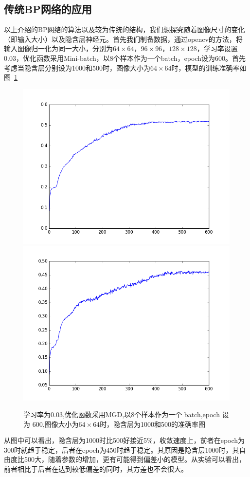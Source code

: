 \subsection{传统BP网络的应用}
以上介绍的BP网络的算法以及较为传统的结构，我们想探究随着图像尺寸的变化（即输入大小）以及隐含层神经元。首先我们制备数据，通过opencv的方法，将输入图像归一化为同一大小，分别为$64\times 64$，$96\times 96$，$128\times 128$，学习率设置0.03，优化函数采用Mini-batch，以8个样本作为一个batch，epoch设为600。首先考虑当隐含层分别设为1000和500时，图像大小为$64\times 64$时，模型的训练准确率如图~\ref{fig:bp6}
\begin{figure}[htb]
\centering
\includegraphics[scale=0.35]{../figures/Log/BP_new1/BP_new1_acc.png}
\includegraphics[scale=0.35]{../figures/Log/BP_new4/BP_new4_acc.png} 
\caption{学习率为0.03,优化函数采用MGD,以8个样本作为一个 batch,epoch 设为 600,图像大小为$64\times 64$时，隐含层为1000和500的准确率图}
\label{fig:bp6}
\end{figure}
从图中可以看出，隐含层为1000时比500好接近5\%，收敛速度上，前者在epoch为300时就趋于稳定，后者在epoch为450时趋于稳定。其原因是隐含层1000时，其自由度比500大，随着参数的增加，更有可能得到偏差小的模型。从实验可以看出，前者相比于后者在达到较低偏差的同时，其方差也不会很大。

